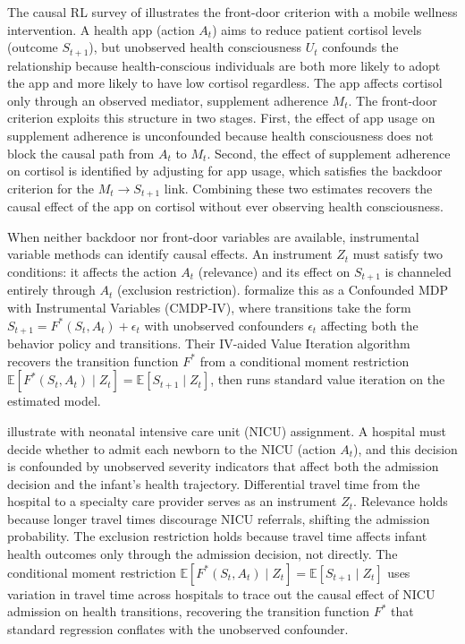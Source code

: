 The causal RL survey of \citet{dacostacunha2025unifying} illustrates the front-door criterion with a mobile wellness intervention. A health app (action $A_t$) aims to reduce patient cortisol levels (outcome $S_{t+1}$), but unobserved health consciousness $U_t$ confounds the relationship because health-conscious individuals are both more likely to adopt the app and more likely to have low cortisol regardless. The app affects cortisol only through an observed mediator, supplement adherence $M_t$. The front-door criterion exploits this structure in two stages. First, the effect of app usage on supplement adherence is unconfounded because health consciousness does not block the causal path from $A_t$ to $M_t$. Second, the effect of supplement adherence on cortisol is identified by adjusting for app usage, which satisfies the backdoor criterion for the $M_t \to S_{t+1}$ link. Combining these two estimates recovers the causal effect of the app on cortisol without ever observing health consciousness.

When neither backdoor nor front-door variables are available, instrumental variable methods can identify causal effects. An instrument $Z_t$ must satisfy two conditions: it affects the action $A_t$ (relevance) and its effect on $S_{t+1}$ is channeled entirely through $A_t$ (exclusion restriction). \citet{liao2024_iv_rl} formalize this as a Confounded MDP with Instrumental Variables (CMDP-IV), where transitions take the form $S_{t+1} = F^*(S_t, A_t) + \epsilon_t$ with unobserved confounders $\epsilon_t$ affecting both the behavior policy and transitions. Their IV-aided Value Iteration algorithm recovers the transition function $F^*$ from a conditional moment restriction $\mathbb{E}[F^*(S_t, A_t) \mid Z_t] = \mathbb{E}[S_{t+1} \mid Z_t]$, then runs standard value iteration on the estimated model.

\citet{liao2024_iv_rl} illustrate with neonatal intensive care unit (NICU) assignment. A hospital must decide whether to admit each newborn to the NICU (action $A_t$), and this decision is confounded by unobserved severity indicators that affect both the admission decision and the infant's health trajectory. Differential travel time from the hospital to a specialty care provider serves as an instrument $Z_t$. Relevance holds because longer travel times discourage NICU referrals, shifting the admission probability. The exclusion restriction holds because travel time affects infant health outcomes only through the admission decision, not directly. The conditional moment restriction $\mathbb{E}[F^*(S_t, A_t) \mid Z_t] = \mathbb{E}[S_{t+1} \mid Z_t]$ uses variation in travel time across hospitals to trace out the causal effect of NICU admission on health transitions, recovering the transition function $F^*$ that standard regression conflates with the unobserved confounder.

